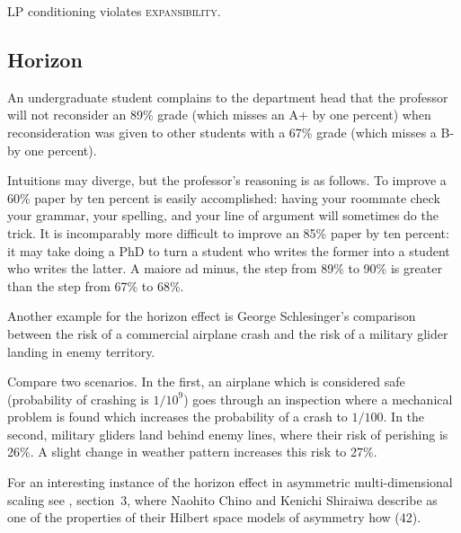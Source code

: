 \documentclass[phd,12pt,oneside]{ubcthesis}
\begin{document}
LP conditioning violates \textsc{expansibility}.

\subsection{Horizon}
\label{subsec:uurohkei}

\begin{quotex}
  \label{ex:complaint} An
  undergraduate student complains to the department head that the
  professor will not reconsider an 89\% grade (which misses an A+ by
  one percent) when reconsideration was given to other students with a
  67\% grade (which misses a B- by one percent).
\end{quotex}

Intuitions may diverge, but the professor's reasoning is as follows.
To improve a 60\% paper by ten percent is easily accomplished: having
your roommate check your grammar, your spelling, and your line of
argument will sometimes do the trick. It is incomparably more
difficult to improve an 85\% paper by ten percent: it may take doing a
PhD to turn a student who writes the former into a student who writes
the latter. A maiore ad minus, the step from 89\% to 90\% is greater
than the step from 67\% to 68\%.

Another example for the horizon effect is George Schlesinger's
comparison between the risk of a commercial airplane crash and the
risk of a military glider landing in enemy territory.

\begin{quotex}
  \label{ex:schlesinger} Compare two
  scenarios. In the first, an airplane which is considered safe
  (probability of crashing is $1/10^{9}$) goes through an
  inspection where a mechanical problem is found which increases
  the probability of a crash to $1/100$. In the second, military
  gliders land behind enemy lines, where their risk of perishing
  is 26\%. A slight change in weather pattern increases this risk
  to 27\%. 
\end{quotex}

For an interesting instance of the horizon effect in asymmetric
multi-dimen\-sional scaling see , section~3,
where Naohito Chino and Kenichi Shiraiwa describe as one of the
properties of their Hilbert space models of asymmetry how  (42).
\end{document}
